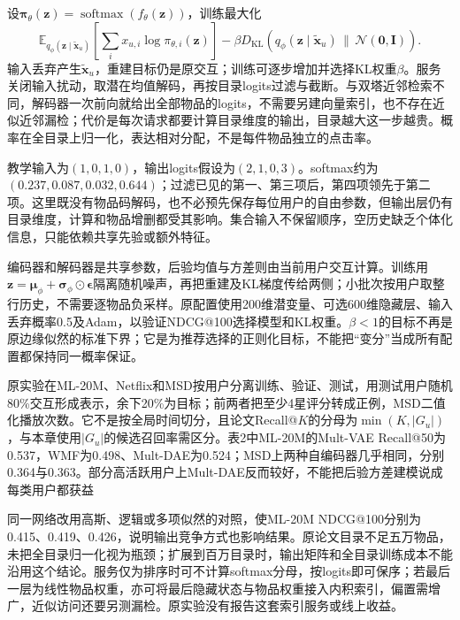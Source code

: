 设$\bm\pi_\theta(\bm z)=\operatorname{softmax}(f_\theta(\bm z))$，训练最大化
\begin{equation}
 \mathbb E_{q_\phi(\bm z\mid\widetilde{\bm x}_u)}
       \left[\sum_i x_{u,i}\log\pi_{\theta,i}(\bm z)\right]
 -\beta D_{\mathrm{KL}}\!\left(q_\phi(\bm z\mid\widetilde{\bm x}_u)
                              \,\|\,\mathcal N(\bm0,\bm I)\right).
 \label{eq:rs-mult-vae}
\end{equation}
输入丢弃产生$\widetilde{\bm x}_u$，重建目标仍是原交互；训练可逐步增加并选择KL权重$\beta$。服务关闭输入扰动，取潜在均值解码，再按目录logits过滤与截断。与双塔近邻检索不同，解码器一次前向就给出全部物品的logits，不需要另建向量索引，也不存在近似近邻漏检；代价是每次请求都要计算目录维度的输出，目录越大这一步越贵。概率在全目录上归一化，表达相对分配，不是每件物品独立的点击率。

教学输入为$(1,0,1,0)$，输出logits假设为$(2,1,0,3)$。softmax约为$(0.237,0.087,0.032,0.644)$；过滤已见的第一、第三项后，第四项领先于第二项。这里既没有物品码解码，也不必预先保存每位用户的自由参数，但输出层仍有目录维度，计算和物品增删都受其影响。集合输入不保留顺序，空历史缺乏个体化信息，只能依赖共享先验或额外特征。

编码器和解码器是共享参数，后验均值与方差则由当前用户交互计算。训练用$\bm z=\bm\mu_\phi+\bm\sigma_\phi\odot\bm\epsilon$隔离随机噪声，再把重建及KL梯度传给两侧；小批次按用户取整行历史，不需要逐物品负采样。原配置使用200维潜变量、可选600维隐藏层、输入丢弃概率0.5及Adam，以验证NDCG@100选择模型和KL权重。$\beta<1$的目标不再是原边缘似然的标准下界；它是为推荐选择的正则化目标，不能把“变分”当成所有配置都保持同一概率保证。

原实验在ML-20M、Netflix和MSD按用户分离训练、验证、测试，用测试用户随机80\%交互形成表示，余下20\%为目标；前两者把至少4星评分转成正例，MSD二值化播放次数。它不是按全局时间切分，且论文Recall@$K$的分母为$\min(K,|G_u|)$，与本章使用$|G_u|$的候选召回率需区分。表2中ML-20M的Mult-VAE Recall@50为0.537，WMF为0.498、Mult-DAE为0.524；MSD上两种自编码器几乎相同，分别0.364与0.363。部分高活跃用户上Mult-DAE反而较好，不能把后验方差建模说成每类用户都获益

同一网络改用高斯、逻辑或多项似然的对照，使ML-20M NDCG@100分别为0.415、0.419、0.426，说明输出竞争方式也影响结果。原论文目录不足五万物品，未把全目录归一化视为瓶颈；扩展到百万目录时，输出矩阵和全目录训练成本不能沿用这个结论。服务仅为排序时可不计算softmax分母，按logits即可保序；若最后一层为线性物品权重，亦可将最后隐藏状态与物品权重接入内积索引，偏置需增广，近似访问还要另测漏检。原实验没有报告这套索引服务或线上收益。

